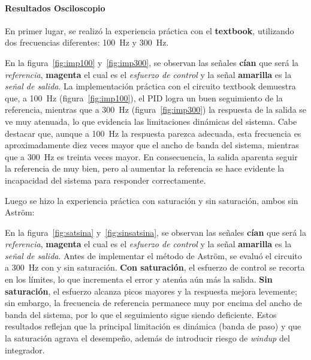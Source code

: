 \paragraph{Resultados Osciloscopio}
En primer lugar, se realizó la experiencia práctica con el \textbf{textbook}, utilizando dos frecuencias diferentes: \SI{100}{\hertz} y \SI{300}{\hertz}.




En la figura~\ref{fig:imp100} y~\ref{fig:imp300}, se observan las señales \textbf{cían} que será la \textit{referencia}, \textbf{magenta} el cual es el \textit{esfuerzo de control} y la señal \textbf{amarilla} es la \textit{señal de salida}. \hfill \break
La implementación práctica con el circuito textbook demuestra que, a \SI{100}{\hertz} (figura~\ref{fig:imp100}), el PID logra un buen seguimiento de la referencia, mientras que a \SI{300}{\hertz} (figura~\ref{fig:imp300}) la respuesta de la salida se ve muy atenuada, lo que evidencia las limitaciones dinámicas del sistema. Cabe destacar que, aunque a \SI{100}{\hertz} la respuesta parezca adecuada, esta frecuencia es aproximadamente diez veces mayor que el ancho de banda del sistema, mientras que a \SI{300}{\hertz} es treinta veces mayor. En consecuencia, la salida aparenta seguir la referencia de muy bien, pero al aumentar la referencia se hace evidente la incapacidad del sistema para responder correctamente.

Luego se hizo la experiencia práctica con saturaci\'on y sin saturaci\'on, ambos sin Astr\"om:

En la figura~\ref{fig:satsina} y~\ref{fig:sinsatsina}, se observan las señales \textbf{cían} que será la \textit{referencia}, \textbf{magenta} el cual es el \textit{esfuerzo de control} y la señal \textbf{amarilla} es la \textit{señal de salida}. \hfill \break
Antes de implementar el método de Aström, se evaluó el circuito a \SI{300}{\hertz} con y sin saturación. 
\textbf{Con saturación}, el esfuerzo de control se recorta en los límites, lo que incrementa el error y atenúa aún más la salida. 
\textbf{Sin saturación}, el esfuerzo alcanza picos mayores y la respuesta mejora levemente; sin embargo, la frecuencia de referencia permanece muy por encima del ancho de banda del sistema, por lo que el seguimiento sigue siendo deficiente. 
Estos resultados reflejan que la principal limitación es dinámica (banda de paso) y que la saturación agrava el desempeño, además de introducir riesgo de \emph{windup} del integrador. \hfill \break

